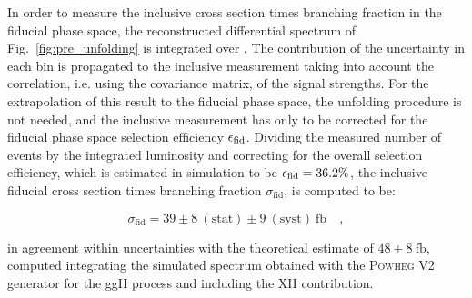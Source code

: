 In order to measure the inclusive cross section times branching fraction in the fiducial phase space, the reconstructed differential spectrum of Fig.~\ref{fig:pre_unfolding} is integrated over \pth. The contribution of the uncertainty in each bin is propagated to the inclusive measurement taking into account the correlation, i.e. using the covariance matrix, of the signal strengths. For the extrapolation of this result to the fiducial phase space, the unfolding procedure is not needed, and the inclusive measurement has only to be corrected for the fiducial phase space selection efficiency $\epsilon_{\rm{fid}}$. Dividing the measured number of events by the integrated luminosity and correcting for the overall selection efficiency, which is estimated in simulation to be $\epsilon_{\rm{fid}} = 36.2\%$, the inclusive fiducial cross section times branching fraction $\sigma_{\mathrm{fid}}$, is computed to be:

\begin{equation}
\sigma_{\mathrm{fid}} = 39\pm 8~(\mathrm{stat}) \pm 9~(\mathrm{syst})~\mathrm{fb} \quad ,
\end{equation} 

in agreement within uncertainties with the theoretical estimate of $48 \pm 8 ~\mathrm{fb}$, computed integrating the simulated spectrum obtained with the \textsc{Powheg V2} generator for the ggH process and including the XH contribution.


